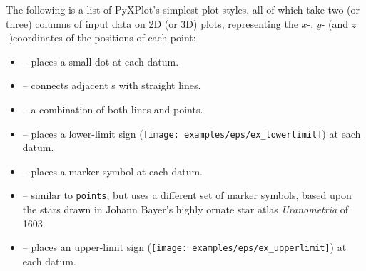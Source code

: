 The following is a list of PyXPlot's simplest plot styles, all of which take
two (or three) columns of input data on 2D (or 3D) plots, representing the
$x$-, $y$- (and $z$-)coordinates of the positions of each point:
\begin{itemize}
\item {} -- places a small dot at each datum.
\item {} -- connects adjacent \datapoint s with straight lines.
\item {} -- a combination of both lines and points.
\item {} -- places a lower-limit sign (\texttt{[image: examples/eps/ex\_lowerlimit]}) at each datum.
\item {} -- places a marker symbol at each datum.
\item {} -- similar to {\tt points}, but uses a different set of marker symbols, based upon the stars drawn in Johann Bayer's highly ornate star atlas {\it Uranometria} of 1603.
\item {} -- places an upper-limit sign (\texttt{[image: examples/eps/ex\_upperlimit]}) at each datum.
\end{itemize}

